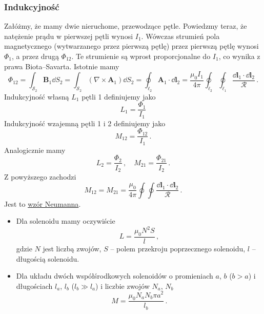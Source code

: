 \documentclass[../main.tex]{subfiles}
\begin{document}
\subsubsection{Indukcyjność}
Załóżmy, że mamy dwie nieruchome, przewodzące pętle. Powiedzmy teraz, że natężenie prądu w pierwszej
pętli wynosi \(I_1\). Wówczas strumień pola magnetycznego (wytwarzanego przez pierwszą pętlę) przez
pierwszą pętlę wynosi \(\Phi_1\), a przez drugą \(\Phi_{12}\). Te strumienie są wprost
proporcjonalne do \(I_1\), co wynika z prawa Biota--Savarta. Istotnie mamy
\begin{equation*}
    \Phi_{12}=\int_{\mathcal{S}_2}\mathbf{B}_1\dd{S_2}=\int_{\mathcal{S}_2}(\nabla\times\mathbf{A}_1)\dd{S_2}=\oint_{\ell_2}\mathbf{A}_1\cdot\dd{\mathbf{l}_2}=\frac{\mu_0I_1}{4\pi}\oint_{\ell_2}\oint_{\ell_1}\frac{\dd{\mathbf{l}_1\cdot\dd{\mathbf{l}_2}}}{\mathcal{R}}\,.
\end{equation*}
Indukcyjność własną \(L_1\) pętli 1 definiujemy jako 
\begin{equation*}
    L_1=\frac{\Phi_1}{I_1}
\end{equation*}
Indukcyjność wzajemną pętli 1 i 2 definiujemy jako
\begin{equation*}
    M_{12}=\frac{\Phi_{12}}{I_1}\,.
\end{equation*}
Analogicznie mamy
\begin{equation*}
    L_2=\frac{\Phi_2}{I_2}\,,\quad M_{21}=\frac{\Phi_{21}}{I_2}\,.
\end{equation*}
Z powyższego zachodzi
\begin{equation*}
    M_{12}=M_{21}=\frac{\mu_0}{4\pi}\oint\oint\frac{\dd{\mathbf{l}_1\cdot\dd{\mathbf{l}_2}}}{\mathcal{R}}\,.
\end{equation*}
Jest to \underline{wzór Neumanna}. 

\begin{itemize}
    \item Dla solenoidu mamy oczywiście
    \begin{equation*}
        L=\frac{\mu_0N^2S}{l}\,,
    \end{equation*}
    gdzie \(N\) jest liczbą zwojów, \(S\) -- polem przekroju poprzecznego solenoidu, \(l\) --
    długością solenoidu.
    
    \item Dla układu dwóch współśrodkowych solenoidów o promieniach \(a\), \(b\) (\(b>a\)) i
    długościach \(l_a\), \(l_b\) (\(l_b\gg l_a\)) i liczbie zwojów \(N_a\), \(N_b\)
    \begin{equation*}
        M=\frac{\mu_0N_aN_b\pi a^2}{l_b}\,.
    \end{equation*}
\end{itemize}
\end{document}
